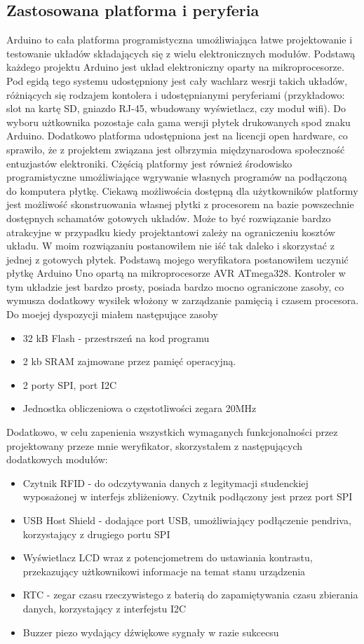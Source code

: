 \documentclass[declaration,shortabstract, mgr]{iithesis}
\begin{document}
\subsection{Zastosowana platforma i peryferia}
\indent Arduino to cała platforma programistyczna umożliwiająca łatwe projektowanie i testowanie układów składających się z wielu elektronicznych modułów. Podstawą każdego projektu Arduino jest układ elektroniczny oparty na mikroprocesorze. Pod egidą tego systemu udostępniony jest cały wachlarz wesrji takich układów, różniących się rodzajem kontolera i udostępnianymi peryferiami (przykładowo: slot na kartę SD, gniazdo RJ-45, wbudowany wyświetlacz, czy moduł wifi). Do wyboru użtkownika pozostaje cała gama wersji płytek drukowanych spod znaku Arduino. Dodatkowo platforma udostępniona jest na licencji open hardware, co sprawiło, że z projektem związana jest olbrzymia międzynarodowa społeczność entuzjastów elektroniki. Cżęścią platformy jest również środowisko programistyczne umożliwiające wgrywanie własnych programów na podłączoną do komputera płytkę.
\indent Ciekawą możliwościa dostępną dla użytkowników platformy jest możliwość skonstruowania własnej płytki z procesorem na bazie powszechnie dostępnych schamatów gotowych układów. Może to być rozwiązanie bardzo atrakcyjne w przypadku kiedy projektantowi zależy na ograniczeniu kosztów układu. W moim rozwiązaniu postanowiłem nie iść tak daleko i skorzystać z jednej z gotowych płytek.
\indent Podstawą mojego weryfikatora postanowiłem uczynić płytkę Arduino Uno opartą na mikroprocesorze AVR ATmega328. Kontroler w tym układzie jest bardzo prosty, posiada bardzo mocno ograniczone zasoby, co wymusza dodatkowy wysiłek włożony w zarządzanie pamięcią i czasem procesora. Do moejej dyspozycji miałem następujące zasoby\\
\begin{itemize}
\item 32 kB Flash - przestrszeń na kod programu
\item 2 kb SRAM zajmowane przez pamięć operacyjną.
\item 2 porty SPI, port I2C
\item Jednostka obliczeniowa o częstotliwości zegara 20MHz
\end{itemize}
\indent Dodatkowo, w celu zapenienia wszystkich wymaganych funkcjonalności przez projektowany przeze mnie weryfikator, skorzystałem z następujących dodatkowych modułów:
\begin{itemize}
\item Czytnik RFID - do odczytywania danych z legitymacji studenckiej wyposażonej w interfejs zbliżeniowy. Czytnik podłączony jest przez port SPI
\item USB Host Shield - dodające port USB, umożliwiający podłączenie pendriva, korzystający z drugiego portu SPI
\item Wyświetlacz LCD wraz z  potencjometrem do ustawiania kontrastu, przekazujący użtkownikowi informacje na temat stanu urządzenia
\item RTC - zegar czasu rzeczywistego z baterią do zapamiętywania czasu zbierania danych, korzystający z interfejstu I2C
\item Buzzer piezo wydający dźwiękowe sygnały w razie sukcecsu
\end{itemize}
\end{document}
